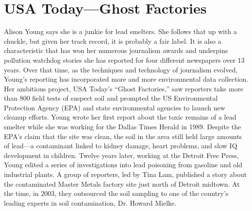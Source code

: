 \section{USA Today—Ghost Factories}
Alison Young says she is a junkie for lead smelters. She follows that up with
a chuckle, but given her track record, it is probably a fair label. It is also a
characteristic that has won her numerous journalism awards and underpins
pollution watchdog stories she has reported for four different newspapers
over 13 years.
Over that time, as the techniques and technology of journalism evolved,
Young's reporting has incorporated more and more environmental data
collection. Her ambitious project, USA Today's ``Ghost Factories,'' saw
reporters take more than 800 field tests of suspect soil and prompted the
US Environmental Protection Agency (EPA) and state environmental agencies
to launch new cleanup efforts.
Young wrote her first report about the toxic remains of a lead smelter while
she was working for the Dallas Times Herald in 1989. Despite the EPA's
claim that the site was clean, the soil in the area still held large amounts of
lead—a contaminant linked to kidney damage, heart problems, and slow IQ
development in children.
Twelve years later, working at the Detroit Free Press, Young edited a series of
investigations into lead poisoning from gasoline and old industrial plants. A
group of reporters, led by Tina Lam, published a story about the contaminated
Master Metals factory site just north of Detroit midtown. At the time,
in 2003, they outsourced the soil sampling to one of the country's leading
experts in soil contamination, Dr. Howard Mielke.

